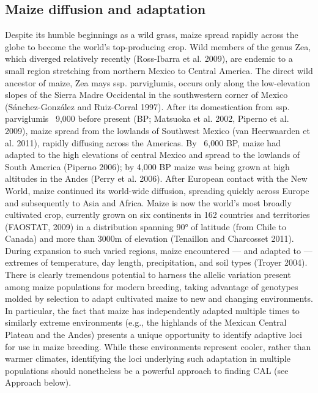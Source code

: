 \subsection*{Maize diffusion and adaptation}
Despite its humble beginnings as a wild grass, maize spread rapidly across the globe to become the world’s top-producing crop.  Wild members of the genus Zea, which diverged relatively recently (Ross-Ibarra et al. 2009), are endemic to a small region stretching from northern Mexico to Central America. The direct wild ancestor of maize, Zea mays ssp. parviglumis, occurs only along the low-elevation slopes of the Sierra Madre Occidental in the southwestern corner of Mexico (Sánchez-González and Ruiz-Corral 1997).  After its domestication from ssp. parviglumis ~9,000 before present (BP; Matsuoka et al. 2002, Piperno et al. 2009), maize spread from the lowlands of Southwest Mexico (van Heerwaarden et al. 2011), rapidly diffusing across the Americas.  By ~6,000 BP, maize had adapted to the high elevations of central Mexico and spread to the lowlands of South America (Piperno 2006); by 4,000 BP maize was being grown at high altitudes in the Andes (Perry et al. 2006). After European contact with the New World, maize continued its world-wide diffusion, spreading quickly across Europe and subsequently to Asia and Africa.  Maize is now the world’s most broadly cultivated crop, currently grown on six continents in 162 countries and territories (FAOSTAT, 2009) in a distribution spanning 90° of latitude (from Chile to Canada) and more than 3000m of elevation (Tenaillon and Charcosset 2011).  During expansion to such varied regions, maize encountered — and adapted to — extremes of temperature, day length, precipitation, and soil types (Troyer 2004).  
There is clearly tremendous potential to harness the allelic variation present among maize populations for modern breeding, taking advantage of genotypes molded by selection to adapt cultivated maize to new and changing environments.  In particular, the fact that maize has independently adapted multiple times to similarly extreme environments (e.g., the highlands of the Mexican Central Plateau and the Andes) presents a unique opportunity to identify adaptive loci for use in maize breeding.  While these environments represent cooler, rather than warmer climates, identifying the loci underlying such adaptation in multiple populations should nonetheless be a powerful approach to finding CAL (see Approach below).

